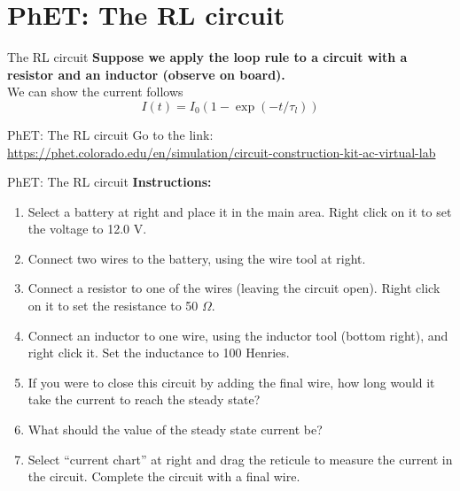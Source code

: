 \documentclass{beamer}
\begin{document}
\section{PhET: The RL circuit}

\begin{frame}{The RL circuit}
\textbf{Suppose we apply the loop rule to a circuit with a resistor and an inductor (observe on board).} \\ \vspace{0.5cm}
We can show the current follows
\begin{equation}
I(t) = I_0 \left(1 - \exp(-t/\tau_l)\right)
\end{equation}
\end{frame}

\begin{frame}{PhET: The RL circuit}
Go to the link: \\ \vspace{0.5cm}
\url{https://phet.colorado.edu/en/simulation/circuit-construction-kit-ac-virtual-lab}
\end{frame}

\begin{frame}{PhET: The RL circuit}
\small
\textbf{Instructions:}
\begin{enumerate}
\item Select a battery at right and place it in the main area.  Right click on it to set the voltage to 12.0 V.
\item Connect two wires to the battery, using the wire tool at right.
\item Connect a resistor to one of the wires (leaving the circuit open).  Right click on it to set the resistance to 50 $\Omega$.
\item Connect an inductor to one wire, using the inductor tool (bottom right), and right click it.  Set the inductance to 100 Henries.
\item If you were to close this circuit by adding the final wire, how long would it take the current to reach the steady state?
\item What should the value of the steady state current be?
\item Select ``current chart'' at right and drag the reticule to measure the current in the circuit.  Complete the circuit with a final wire.
\end{enumerate}
\end{frame}
\end{document}
